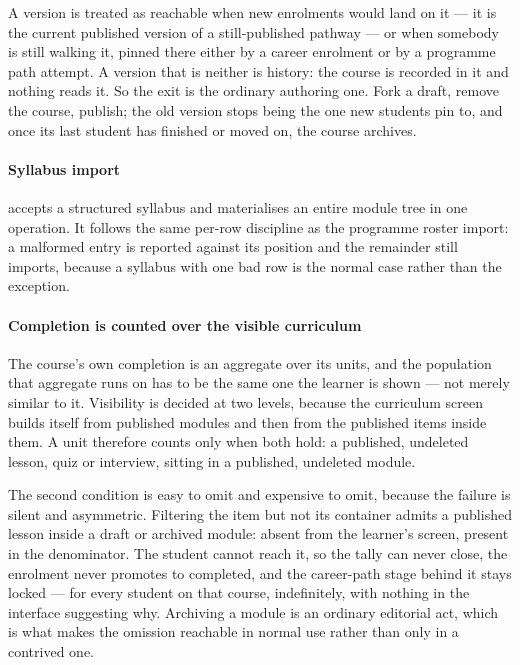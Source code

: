 A version is treated as reachable when new enrolments would land on it --- it is the current published version of a still-published pathway --- or when somebody is still walking it, pinned there either by a career enrolment or by a programme path attempt. A version that is neither is history: the course is recorded in it and nothing reads it. So the exit is the ordinary authoring one. Fork a draft, remove the course, publish; the old version stops being the one new students pin to, and once its last student has finished or moved on, the course archives.

\paragraph{Syllabus import}
 accepts a structured syllabus and materialises an entire module tree in one operation. It follows the same per-row discipline as the programme roster import: a malformed entry is reported against its position and the remainder still imports, because a syllabus with one bad row is the normal case rather than the exception.

\paragraph{Completion is counted over the visible curriculum}
The course's own completion is an aggregate over its units, and the population that aggregate runs on has to be the same one the learner is shown --- not merely similar to it. Visibility is decided at two levels, because the curriculum screen builds itself from published modules and then from the published items inside them. A unit therefore counts only when both hold: a published, undeleted lesson, quiz or interview, sitting in a published, undeleted module.

The second condition is easy to omit and expensive to omit, because the failure is silent and asymmetric. Filtering the item but not its container admits a published lesson inside a draft or archived module: absent from the learner's screen, present in the denominator. The student cannot reach it, so the tally can never close, the enrolment never promotes to completed, and the career-path stage behind it stays locked --- for every student on that course, indefinitely, with nothing in the interface suggesting why. Archiving a module is an ordinary editorial act, which is what makes the omission reachable in normal use rather than only in a contrived one.

